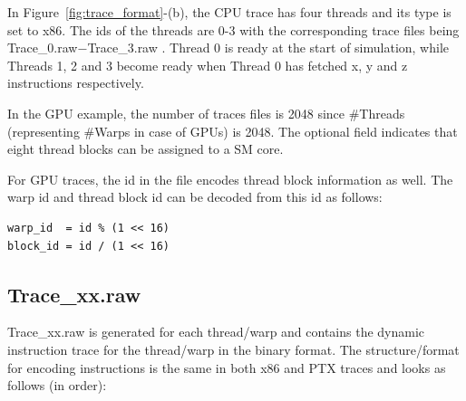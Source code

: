 In Figure~\ref{fig:trace_format}-(b), the CPU trace has four threads and its
type is set to x86. The ids of the threads are 0-3 with the corresponding trace
files being Trace\_0.raw$-$Trace\_3.raw . Thread 0 is ready at the start of
simulation, while Threads 1, 2 and 3 become ready when Thread 0 has fetched x,
  y and z instructions respectively.


In the GPU example, the number of traces files is 2048 since \#Threads
(representing \#Warps in case of GPUs) is 2048.  The optional field indicates
that eight thread blocks can be assigned to a SM core. 

For GPU traces, the id in the file encodes thread block information as
well. The warp id and thread block id can be decoded from this id as follows:

\begin{Verbatim}
warp_id  = id % (1 << 16)
block_id = id / (1 << 16)
\end{Verbatim}


\subsection{Trace\_xx.raw}

Trace\_xx.raw is generated for each thread/warp and contains the
dynamic instruction trace for the thread/warp in the binary
format. The structure/format for encoding instructions is the same in
both x86 and PTX traces and looks as follows (in order):




